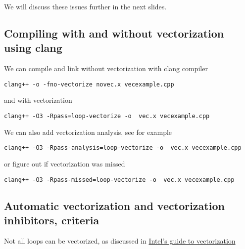 We will discuss these issues further in the next slides.  

\subsection*{Compiling with and without vectorization using clang}
We can compile and link without vectorization with clang compiler


\begin{verbatim}
clang++ -o -fno-vectorize novec.x vecexample.cpp

\end{verbatim}

and with vectorization


\begin{verbatim}
clang++ -O3 -Rpass=loop-vectorize -o  vec.x vecexample.cpp 

\end{verbatim}

We can also add vectorization analysis, see for example


\begin{verbatim}
clang++ -O3 -Rpass-analysis=loop-vectorize -o  vec.x vecexample.cpp 

\end{verbatim}

or figure out if vectorization was missed


\begin{verbatim}
clang++ -O3 -Rpass-missed=loop-vectorize -o  vec.x vecexample.cpp 

\end{verbatim}


\subsection*{Automatic vectorization and vectorization inhibitors, criteria}

Not all loops can be vectorized, as discussed in \href{{https://software.intel.com/en-us/articles/a-guide-to-auto-vectorization-with-intel-c-compilers}}{Intel's guide to vectorization}

